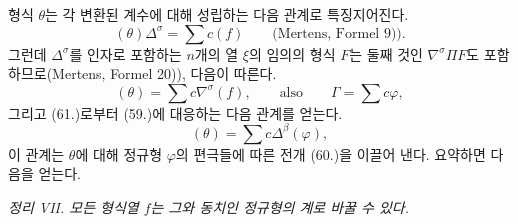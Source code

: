 
형식 $\theta$는 각 변환된 계수에 대해 성립하는 다음 관계로 특징지어진다.
\[
 (\theta)\Delta^\sigma=\sum c(f)\qquad\text{(Mertens, Formel 9)).}
\]
그런데 $\Delta^\sigma$를 인자로 포함하는 $n$개의 열 $\xi$의 임의의 형식 $F$는 둘째 것인 $\nabla^\sigma\Pi F$도 포함하므로(Mertens, Formel 20)), 다음이 따른다.
\[
 (\theta)=\sum c\nabla^\sigma(f),\qquad\text{also}\qquad \Gamma=\sum c\varphi,
\]
그리고 (61.)로부터 (59.)에 대응하는 다음 관계를 얻는다.
\[
 (\theta)=\sum c\Delta^\beta(\varphi),
\]
이 관계는 $\theta$에 대해 정규형 $\varphi$의 편극들에 따른 전개 (60.)을 이끌어 낸다. 요약하면 다음을 얻는다.

\emph{정리 VII. 모든 형식열 $f$는 그와 동치인 정규형의 계로 바꿀 수 있다.}
